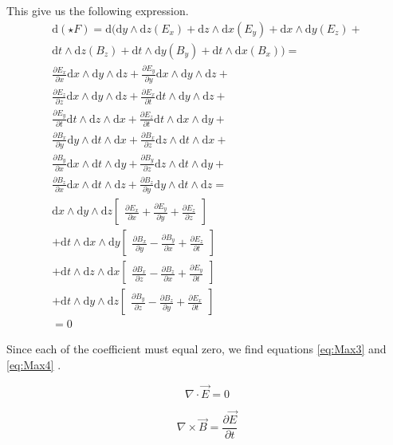 This give us the following expression.
\begin{gather*}
\mathrm{d} (\star F)=\mathrm{d}( \mathrm{d}y \wedge \mathrm{d}z(E_x)+\mathrm{d}z \wedge \mathrm{d}x(E_y)+\mathrm{d}x \wedge \mathrm{d}y(E_z) + \\\mathrm{d}t \wedge \mathrm{d}z(B_z)+\mathrm{d}t \wedge \mathrm{d}y(B_y)+\mathrm{d}t \wedge \mathrm{d}x(B_x))=\\
\frac{\partial E_x}{\partial x} \mathrm{d}x \wedge \mathrm{d}y \wedge \mathrm{d}z+
\frac{\partial E_y}{\partial y} \mathrm{d}x \wedge \mathrm{d}y \wedge \mathrm{d}z+\\
\frac{\partial E_z}{\partial z} \mathrm{d}x \wedge \mathrm{d}y \wedge \mathrm{d}z+
\frac{\partial E_x}{\partial t} \mathrm{d}t \wedge \mathrm{d}y \wedge \mathrm{d}z+ \\
\frac{\partial E_y}{\partial t} \mathrm{d}t \wedge \mathrm{d}z \wedge \mathrm{d}x+
\frac{\partial E_z}{\partial t} \mathrm{d}t \wedge \mathrm{d}x \wedge \mathrm{d}y+ \\
\frac{\partial B_x}{\partial y} \mathrm{d}y \wedge \mathrm{d}t \wedge \mathrm{d}x+ 
\frac{\partial B_x}{\partial z} \mathrm{d}z \wedge \mathrm{d}t \wedge \mathrm{d}x+ \\
\frac{\partial B_y}{\partial x} \mathrm{d}x \wedge \mathrm{d}t \wedge \mathrm{d}y+ 
\frac{\partial B_y}{\partial z} \mathrm{d}z \wedge \mathrm{d}t \wedge \mathrm{d}y+ \\
\frac{\partial B_z}{\partial x} \mathrm{d}x \wedge \mathrm{d}t \wedge \mathrm{d}z+ 
\frac{\partial B_z}{\partial y} \mathrm{d}y \wedge \mathrm{d}t \wedge \mathrm{d}z=\\
\mathrm{d}x \wedge \mathrm{d}y \wedge \mathrm{d}z \begin{bmatrix} \frac{\partial E_x}{\partial x}+ \frac{\partial E_y}{\partial y} + \frac{\partial E_z}{\partial z} \end{bmatrix} \\
+\mathrm{d}t \wedge \mathrm{d}x \wedge \mathrm{d}y \begin{bmatrix} \frac{\partial B_x}{\partial y}- \frac{\partial B_y}{\partial x} + \frac{\partial E_z}{\partial t} \end{bmatrix}\\
+\mathrm{d}t \wedge \mathrm{d}z \wedge \mathrm{d}x \begin{bmatrix} \frac{\partial B_x}{\partial z}- \frac{\partial B_z}{\partial x} + \frac{\partial E_y}{\partial t} \end{bmatrix}\\
+\mathrm{d}t \wedge \mathrm{d}y \wedge \mathrm{d}z \begin{bmatrix} \frac{\partial B_y}{\partial z}- \frac{\partial B_z}{\partial y} + \frac{\partial E_x}{\partial t} \end{bmatrix}\\
=0
 \end{gather*}
 
 Since each of the coefficient must equal zero, we find equations \ref{eq:Max3} and \ref{eq:Max4} . 

\begin{equation}
\nabla \cdot \vec{E}=0
\label{eq:Max3}
\end{equation}

\begin{equation}
\nabla \times \vec{B}= \frac{\partial \vec{E}}{\partial t}
\label{eq:Max4}
\end{equation}
 
